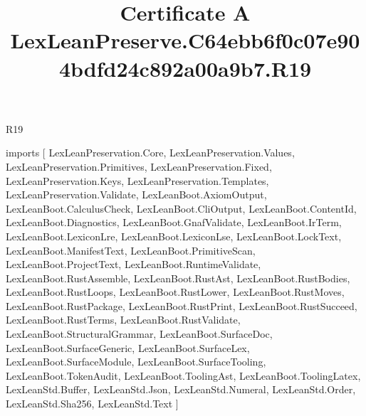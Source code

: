 \begin{lexlean}{R19}
\title{Certificate A LexLeanPreserve.C64ebb6f0c07e904bdfd24c892a00a9b7.R19}
\begin{coremodule}
imports [
  LexLeanPreservation.Core,
  LexLeanPreservation.Values,
  LexLeanPreservation.Primitives,
  LexLeanPreservation.Fixed,
  LexLeanPreservation.Keys,
  LexLeanPreservation.Templates,
  LexLeanPreservation.Validate,
  LexLeanBoot.AxiomOutput,
  LexLeanBoot.CalculusCheck,
  LexLeanBoot.CliOutput,
  LexLeanBoot.ContentId,
  LexLeanBoot.Diagnostics,
  LexLeanBoot.GnafValidate,
  LexLeanBoot.IrTerm,
  LexLeanBoot.LexiconLre,
  LexLeanBoot.LexiconLse,
  LexLeanBoot.LockText,
  LexLeanBoot.ManifestText,
  LexLeanBoot.PrimitiveScan,
  LexLeanBoot.ProjectText,
  LexLeanBoot.RuntimeValidate,
  LexLeanBoot.RustAssemble,
  LexLeanBoot.RustAst,
  LexLeanBoot.RustBodies,
  LexLeanBoot.RustLoops,
  LexLeanBoot.RustLower,
  LexLeanBoot.RustMoves,
  LexLeanBoot.RustPackage,
  LexLeanBoot.RustPrint,
  LexLeanBoot.RustSucceed,
  LexLeanBoot.RustTerms,
  LexLeanBoot.RustValidate,
  LexLeanBoot.StructuralGrammar,
  LexLeanBoot.SurfaceDoc,
  LexLeanBoot.SurfaceGeneric,
  LexLeanBoot.SurfaceLex,
  LexLeanBoot.SurfaceModule,
  LexLeanBoot.SurfaceTooling,
  LexLeanBoot.TokenAudit,
  LexLeanBoot.ToolingAst,
  LexLeanBoot.ToolingLatex,
  LexLeanStd.Buffer,
  LexLeanStd.Json,
  LexLeanStd.Numeral,
  LexLeanStd.Order,
  LexLeanStd.Sha256,
  LexLeanStd.Text
]


\end{coremodule}
\end{lexlean}
